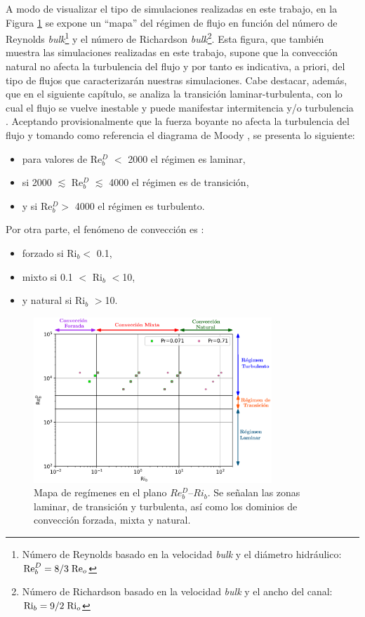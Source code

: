 A modo de visualizar el tipo de simulaciones realizadas en este trabajo, en la Figura \ref{fig:map_flow_regime} se expone un ``mapa''  del régimen de flujo en función del número de Reynolds \textit{bulk}\footnote{Número de Reynolds basado en la velocidad \textit{bulk} y el diámetro hidráulico: $\text{Re}^D_b = 8/3 \hspace*{1mm} \text{Re}_o$} y el número de Richardson \textit{bulk}\footnote{Número de Richardson basado en la velocidad \textit{bulk} y el ancho del canal: $\text{Ri}_b = 9/2 \hspace*{1mm} \text{Ri}_o$}. Esta figura, que también muestra las simulaciones realizadas en este trabajo, supone que la convección natural no afecta la turbulencia del flujo y por tanto es indicativa, a priori, del tipo de flujos que caracterizarán nuestras simulaciones. Cabe destacar, además, que en el siguiente capítulo, se analiza la transición laminar-turbulenta, con lo cual el flujo se vuelve inestable y puede manifestar intermitencia y/o turbulencia \cite{chen2003direct}. Aceptando provisionalmente que la fuerza boyante no afecta la turbulencia del flujo y tomando como referencia el diagrama de Moody \cite{white}, se presenta lo siguiente:


\begin{itemize}
	\item para valores de Re$^D_b$ $<$ 2000 el régimen es laminar,
	\item si 2000 $\lesssim$ Re$^D_b$ $\lesssim$ 4000 el régimen es de transición,
	\item y si Re$^D_b>$ 4000 el régimen es turbulento.
\end{itemize}
Por otra parte, el fenómeno de convección es \cite{incropera,cengelheat}:

\begin{itemize}
	\item forzado si Ri$_b<$ 0.1,
	\item mixto si 0.1 $<$ Ri$_b$ $<$10,
	\item y natural si Ri$_b$ $>$10.
\end{itemize}

\begin{figure}[H]
  \centering
    \includegraphics[width=0.8\textwidth]{figures/cap5/map.eps}
  \caption{Mapa de regímenes en el plano $Re^D_b$–$Ri_b$. Se señalan las zonas laminar, de transición y turbulenta, así como los dominios de convección forzada, mixta y natural.}
  \label{fig:map_flow_regime}
\end{figure}

